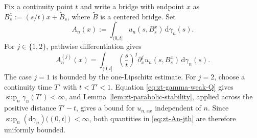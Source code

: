 \documentclass[10pt]{amsart}
\theoremstyle{definition}
\theoremstyle{remark}
\numberwithin{equation}{section}
\newcommand{\1}{\mathbf 1}
\begin{document}
Fix a continuity point $t$ and write a bridge with endpoint $x$ as $B_s^x:=(s/t)x+\widetilde B_s$, where $\widetilde B$ is a centered bridge.  Set
\begin{equation*}
 A_n(x):=\int_{(0,t]}u_n(s,B_s^x)\,\mathrm d\gamma_n(s).
\end{equation*}
For $j\in\{1,2\}$, pathwise differentiation gives
\begin{equation}
 A_n^{(j)}(x)=\int_{(0,t]}\left(\frac{s}{t}\right)^j
 \partial_x^ju_n(s,B_s^x)\,\mathrm d\gamma_n(s).
 \label{eq:zt-An-jth}
\end{equation}
The case $j=1$ is bounded by the one-Lipschitz estimate. For $j=2$, choose a continuity time $T'$ with $t<T'<1$. Equation \eqref{eq:zt-gamma-weak-Q} gives $\sup_n\gamma_n(T')<\infty$, and Lemma~\ref{lem:zt-parabolic-stability}, applied across the positive distance $T'-t$, gives a bound for $u_{n,xx}$ independent of $n$. Since $\sup_n(\mathrm d\gamma_n)((0,t])<\infty$, both quantities in \eqref{eq:zt-An-jth} are therefore uniformly bounded.
\end{document}
